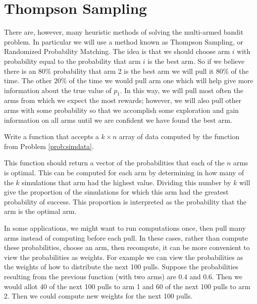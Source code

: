 \section*{Thompson Sampling}

There are, however, many heuristic methods of solving the multi-armed bandit problem.
In particular we will use a method known as Thompson Sampling, or Randomized Probability Matching.
The idea is that we should choose arm $i$ with probability equal to the probability
that arm $i$ is the best arm.  So if we believe there is an $80\%$ probability that
arm 2 is the best arm we will pull it $80\%$ of the time.  The other $20\%$ of the
time we would pull arm one which will help give more information about the true value of $p_1$.
In this way, we will pull most often the arms from which we expect the most rewards;
however, we will also pull other arms with some probability so that we accomplish some
exploration and gain information on all arms until we are confident we have found the best arm.

\begin{problem}
Write a function  that accepts a $k \times n$ array of data computed by the 
function from Problem \ref{prob:simdata}.

This function should return a vector of the probabilities that each of the $n$ arms is optimal.
This can be computed for each arm by determining in how many of the $k$ simulations
that arm had the highest value.  Dividing this number by $k$ will give the proportion
of the simulations for which this arm had the greatest probability of success.
This proportion is interpreted as the probability that the arm is the optimal arm.
\end{problem}

In some applications, we might want to run computations once, then pull many arms instead
of computing before each pull.  In these cases, rather than compute these probabilities,
choose an arm, then recompute, it can be more convenient to view the probabilities as weights.
For example we can view the probabilities as the weights of how to distribute the next 100 pulls.
Suppose the probabilities resulting from the previous function (with two arms) are $0.4$ and $0.6$.
Then we would allot 40 of the next 100 pulls to arm 1 and 60 of the next 100 pulls to arm 2.
Then we could compute new weights for the next 100 pulls.

